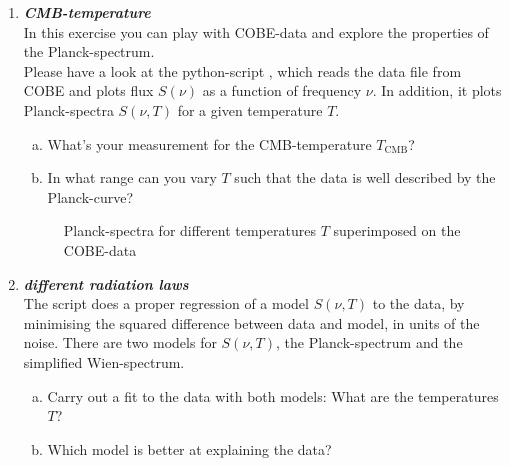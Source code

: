 \documentclass[a4paper,12pt]{article}
\newcommand{\question}[1]{\textbf{\textit{#1}}}
\begin{document}
\begin{enumerate}

\item \question{CMB-temperature}\\
In this exercise you can play with COBE-data and explore the properties of the Planck-spectrum.\\
Please have a look at the python-script , which reads the data file from COBE and plots flux $S(\nu)$ as a function of frequency $\nu$. In addition, it plots Planck-spectra $S(\nu, T)$ for a given temperature $T$. 
\begin{enumerate}[(a)]
\item{What's your measurement for the CMB-temperature $T_\mathrm{CMB}$?}
\item{In what range can you vary $T$ such that the data is well described by the Planck-curve?}
\end{enumerate}

\begin{figure}[h]
\begin{center}
\caption{Planck-spectra for different temperatures $T$ superimposed on the COBE-data}
\end{center}
\end{figure}

\item \question{different radiation laws}\\
The script  does a proper regression of a model $S(\nu,T)$ to the data, by minimising the squared difference between data and model, in units of the noise. There are two models for $S(\nu,T)$, the Planck-spectrum and the simplified Wien-spectrum.
\begin{enumerate}[(a)]
\item{Carry out a fit to the data with both models: What are the temperatures $T$?}
\item{Which model is better at explaining the data?}
\end{enumerate}


\end{enumerate}
\end{document}

